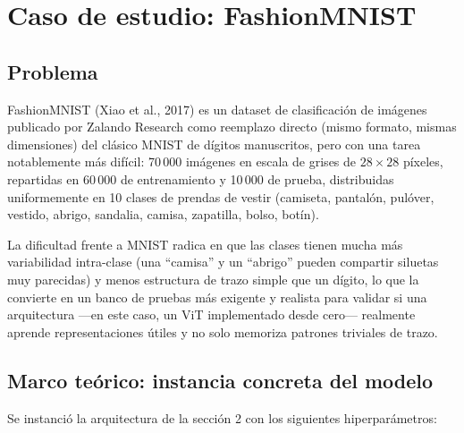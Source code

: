 \documentclass[11pt,a4paper]{article}
\begin{document}
\section{Caso de estudio: FashionMNIST}

\subsection{Problema}

FashionMNIST (Xiao et al., 2017) es un dataset de clasificación de
imágenes publicado por Zalando Research como reemplazo directo (mismo
formato, mismas dimensiones) del clásico MNIST de dígitos manuscritos, pero
con una tarea notablemente más difícil: 70\,000 imágenes en escala de
grises de $28 \times 28$ píxeles, repartidas en 60\,000 de entrenamiento y
10\,000 de prueba, distribuidas uniformemente en 10 clases de prendas de
vestir (camiseta, pantalón, pulóver, vestido, abrigo, sandalia, camisa,
zapatilla, bolso, botín).

La dificultad frente a MNIST radica en que las clases tienen mucha más
variabilidad intra-clase (una ``camisa'' y un ``abrigo'' pueden compartir
siluetas muy parecidas) y menos estructura de trazo simple que un dígito,
lo que la convierte en un banco de pruebas más exigente y realista para
validar si una arquitectura ---en este caso, un ViT implementado desde
cero--- realmente aprende representaciones útiles y no solo memoriza
patrones triviales de trazo.

\subsection{Marco teórico: instancia concreta del modelo}

Se instanció la arquitectura de la sección 2 con los siguientes
hiperparámetros:
\end{document}
